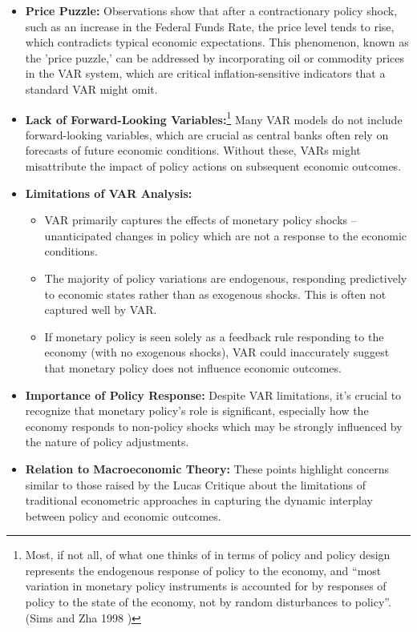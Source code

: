 \begin{itemize}
    \item \textbf{Price Puzzle:} Observations show that after a contractionary policy shock, such as an increase in the Federal Funds Rate, 
    the price level tends to rise, which contradicts typical economic expectations. This phenomenon, known as the 'price puzzle,' 
    can be addressed by incorporating oil or commodity prices in the VAR system, 
    which are critical inflation-sensitive indicators that a standard VAR might omit.

    \item \textbf{Lack of Forward-Looking Variables:}\footnote{Most, if not all,
    of what one thinks of in terms of policy and policy design represents the endogenous response of policy
    to the economy, and “most variation in monetary policy instruments is accounted for by responses of
    policy to the state of the economy, not by random disturbances to policy”. (Sims and Zha 1998 \cite{sims1998bayesian})} 
    Many VAR models do not include forward-looking variables, 
    which are crucial as central banks often rely on forecasts of future economic conditions. 
    Without these, VARs might misattribute the impact of policy actions on subsequent economic outcomes.

    \item \textbf{Limitations of VAR Analysis:}
    \begin{itemize}
        \item VAR primarily captures the effects of monetary policy shocks -- unanticipated changes in policy which are not a response to the economic conditions.
        \item The majority of policy variations are endogenous, responding predictively to economic states rather than as exogenous shocks. 
        This is often not captured well by VAR.
        \item If monetary policy is seen solely as a feedback rule responding to the economy (with no exogenous shocks), 
        VAR could inaccurately suggest that monetary policy does not influence economic outcomes.
    \end{itemize}
    
    \item \textbf{Importance of Policy Response:} Despite VAR limitations, it's crucial to recognize that monetary policy's role is significant, 
    especially how the economy responds to non-policy shocks which may be strongly influenced by the nature of policy adjustments.

    \item \textbf{Relation to Macroeconomic Theory:} These points highlight concerns similar to those raised by the Lucas Critique about the limitations 
    of traditional econometric approaches in capturing the dynamic interplay between policy and economic outcomes.
\end{itemize}


